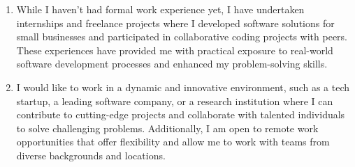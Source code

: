 \documentclass[a4paper,14pt, unknownkeysallowed]{extreport}
\begin{document}
\begin{enumerate}
	\item While I haven't had formal work experience yet, I have undertaken internships and freelance projects where I developed software solutions for small businesses and participated in collaborative coding projects with peers. These experiences have provided me with practical exposure to real-world software development processes and enhanced my problem-solving skills.
	
	\item I would like to work in a dynamic and innovative environment, such as a tech startup, a leading software company, or a research institution where I can contribute to cutting-edge projects and collaborate with talented individuals to solve challenging problems. Additionally, I am open to remote work opportunities that offer flexibility and allow me to work with teams from diverse backgrounds and locations.
\end{enumerate}

	
\end{document}
